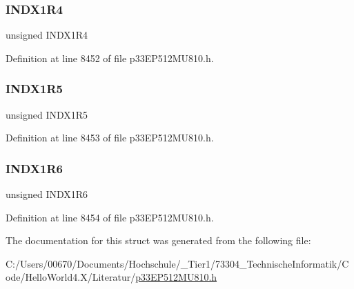 \subsubsection{\texorpdfstring{I\+N\+D\+X1\+R4}{INDX1R4}}
{\footnotesize\ttfamily unsigned I\+N\+D\+X1\+R4}



Definition at line 8452 of file p33\+E\+P512\+M\+U810.\+h.

\mbox{\label{structtag_r_p_i_n_r15_b_i_t_s_a577bbaff5fb0b4bfda195039ee84ea37}} 
\subsubsection{\texorpdfstring{I\+N\+D\+X1\+R5}{INDX1R5}}
{\footnotesize\ttfamily unsigned I\+N\+D\+X1\+R5}



Definition at line 8453 of file p33\+E\+P512\+M\+U810.\+h.

\mbox{\label{structtag_r_p_i_n_r15_b_i_t_s_a0d48947972e3f2dd57e27d6d7f37fff4}} 
\subsubsection{\texorpdfstring{I\+N\+D\+X1\+R6}{INDX1R6}}
{\footnotesize\ttfamily unsigned I\+N\+D\+X1\+R6}



Definition at line 8454 of file p33\+E\+P512\+M\+U810.\+h.



The documentation for this struct was generated from the following file\+:\begin{DoxyCompactItemize}
\item 
C\+:/\+Users/00670/\+Documents/\+Hochschule/\+\_\+\+Tier1/73304\+\_\+\+Technische\+Informatik/\+Code/\+Hello\+World4.\+X/\+Literatur/\hyperlink{p33_e_p512_m_u810_8h}{p33\+E\+P512\+M\+U810.\+h}\end{DoxyCompactItemize}
